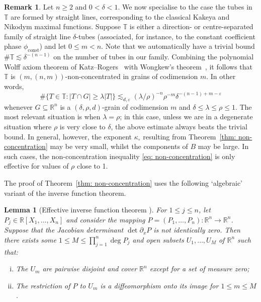 \documentclass[reqno]{amsart}
\numberwithin{equation}{section}
\newcommand{\R}{\mathbb{R}}
\newcommand{\T}{\mathbb{T}}
\theoremstyle{plain}
\newtheorem{lemma}[theorem]{Lemma}
\theoremstyle{definition}
\newtheorem{remark}[theorem]{Remark}
\begin{document}
\begin{remark} Let $n \geq 2$ and $0 < \delta < 1$. We now specialise to the case the tubes in $\T$ are formed by straight lines, corresponding to the classical Kakeya and Nikodym maximal functions. Suppose $\T$ is either a direction- or centre-separated family of straight line $\delta$-tubes (associated, for instance, to the constant coefficient phase $\phi_{\mathrm{const}}$) and let $0 \leq m < n$. Note that we automatically have a trivial bound $\# \T \lesssim \delta^{-(n-1)}$ on the number of tubes in our family. Combining the polynomial Wolff axiom theorem of Katz--Rogers~\cite[Theorem 1.1]{KR2018} with Wongkew's theorem~\cite{Wongkew1993}, it follows that $\T$ is $(m, (n, m))$-non-concentrated in grains of codimension $m$. In other words,
\begin{equation*}
    \#\{T \in \T : |T \cap G| \geq \lambda |T| \} \lesssim_{d, \varepsilon} (\lambda/\rho)^{-n} \rho^{-m}\delta^{-(n-1) + m - \varepsilon}
\end{equation*}
whenever $G \subseteq \R^n$ is a $(\delta, \rho, d)$-grain of codimension $m$ and $\delta \leq \lambda \leq \rho \leq 1$. The most relevant situation is when $\lambda = \rho$; in this case, unless we are in a degenerate situation where $\rho$ is very close to $\delta$, the above estimate always beats the trivial bound. In general, however, the exponent $\kappa_{\circ}$ resulting from Theorem~\ref{thm: non-concentration} may be very small, whilst the components of $B$ may be large. In such cases, the non-concentration inequality \eqref{eq: non-concentration} is only effective for values of $\rho$ close to 1.
\end{remark}

The proof of Theorem~\ref{thm: non-concentration} uses the following `algebraic' variant of the inverse function theorem. 

\begin{lemma}[{Effective inverse function theorem \cite[Lemma 3.2]{CRW2003}}]\label{lem: effective inverse} For $1 \leq j \leq n$, let $P_j \in \R[X_1, \dots, X_n]$  and consider the mapping $P = (P_1, \dots, P_n) \colon \R^n \to \R^n$. Suppose that the Jacobian determinant $\det \partial_x P$ is not identically zero. Then there exists some $1 \leq M \leq \prod_{j=1}^n \deg P_j$ and open subsets $U_1, \dots, U_M$ of $\R^n$ such that:
\begin{enumerate}[i)]
    \item The $U_m$ are pairwise disjoint and cover $\R^n$ except for a set of measure zero;
    \item The restriction of $P$ to $U_m$ is a diffeomorphism onto its image for $1 \leq m \leq M$.
    \end{enumerate}
\end{lemma}
\end{document}

